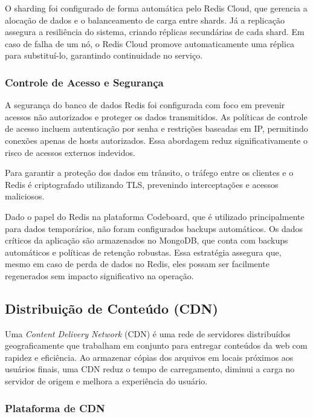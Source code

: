 O sharding foi configurado de forma automática pelo Redis Cloud, que gerencia a alocação de dados e o balanceamento de carga entre shards. Já a replicação assegura a resiliência do sistema, criando réplicas secundárias de cada shard. Em caso de falha de um nó, o Redis Cloud promove automaticamente uma réplica para substituí-lo, garantindo continuidade no serviço.

\subsubsection{Controle de Acesso e Segurança}

A segurança do banco de dados Redis foi configurada com foco em prevenir acessos não autorizados e proteger os dados transmitidos. As políticas de controle de acesso incluem autenticação por senha e restrições baseadas em IP, permitindo conexões apenas de hosts autorizados. Essa abordagem reduz significativamente o risco de acessos externos indevidos.

Para garantir a proteção dos dados em trânsito, o tráfego entre os clientes e o Redis é criptografado utilizando TLS, prevenindo interceptações e acessos maliciosos.

Dado o papel do Redis na plataforma Codeboard, que é utilizado principalmente para dados temporários, não foram configurados backups automáticos. Os dados críticos da aplicação são armazenados no MongoDB, que conta com backups automáticos e políticas de retenção robustas. Essa estratégia assegura que, mesmo em caso de perda de dados no Redis, eles possam ser facilmente regenerados sem impacto significativo na operação.


\subsection{Distribuição de Conteúdo (CDN)}

Uma \emph{Content Delivery Network} (CDN) é uma rede de servidores distribuídos geograficamente que trabalham em conjunto para entregar conteúdos da web com rapidez e eficiência. Ao armazenar cópias dos arquivos em locais próximos aos usuários finais, uma CDN reduz o tempo de carregamento, diminui a carga no servidor de origem e melhora a experiência do usuário.

\subsubsection{Plataforma de CDN}


